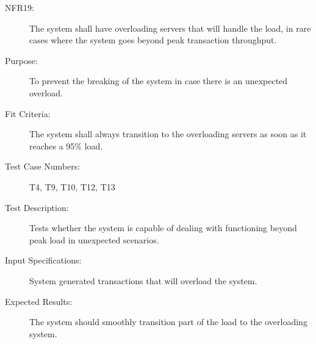 \documentclass[a4paper,twoside,phd]{BYUPhys}
\begin{document}
\begin{description}
\item[NFR19:] The system shall have overloading servers that will handle the load, in rare cases where the system goes beyond peak transaction throughput.
\item[Purpose:] To prevent the breaking of the system in case there is an unexpected overload.
\item[Fit Criteria:] The system shall always transition to the overloading servers as soon as it reaches a 95\% load.
\item[Test Case Numbers:] T4, T9, T10, T12, T13
\item[Test Description:] Tests whether the system is capable of dealing with functioning beyond peak load in unexpected scenarios.
\item[Input Specifications:] System generated transactions that will overload the system.
\item[Expected Results:] The system should smoothly transition part of the load to the overloading system.
\end{description}
\end{document}
